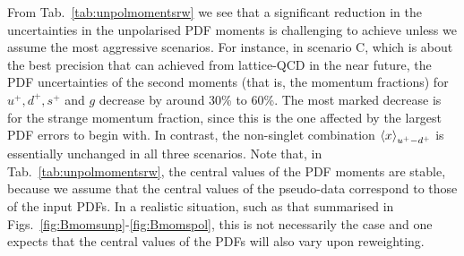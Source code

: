 From Tab.~\ref{tab:unpolmomentsrw} we see that a significant
reduction in the uncertainties in the unpolarised PDF moments is challenging to achieve
unless we assume the most aggressive scenarios.
%
For instance, in scenario C, which is about the best precision that
can achieved from lattice-QCD in the near future, the PDF uncertainties of the second moments
(that is, the momentum fractions) for $u^+,d^+,s^+$ and $g$ decrease by around
30\% to 60\%.
%
The most marked decrease is for the strange momentum fraction, since this is the
one affected by the largest PDF errors to begin with.
%
In contrast, the non-singlet combination $\left\langle x\right\rangle_{u^+-d^+}$ is essentially
unchanged in all three scenarios.
%
Note that, in Tab.~\ref{tab:unpolmomentsrw}, the central values of the PDF 
moments are stable, because we assume that the central values of the 
pseudo-data correspond to those of the input PDFs. 
%
In a realistic situation, such as that summarised in 
Figs.~\ref{fig:Bmomsunp}-\ref{fig:Bmomspol}, 
this is not necessarily the case and one expects
that the central values of the PDFs will also vary upon reweighting.

